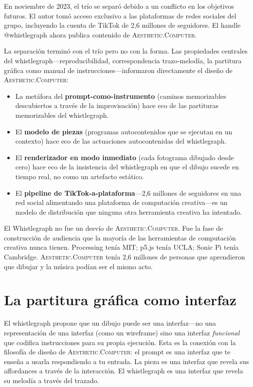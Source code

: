 \documentclass[10pt,letterpaper,twocolumn]{article}
\newcommand{\ac}{\textsc{Aesthetic.Computer}}
\begin{document}
En noviembre de 2023, el trío se separó debido a un conflicto en los objetivos futuros. El autor tomó acceso exclusivo a las plataformas de redes sociales del grupo, incluyendo la cuenta de TikTok de 2,6 millones de seguidores. El handle @whistlegraph ahora publica contenido de \ac{}.

La separación terminó con el trío pero no con la forma. Las propiedades centrales del whistlegraph---reproducibilidad, correspondencia trazo-melodía, la partitura gráfica como manual de instrucciones---informaron directamente el diseño de \ac{}:

\begin{itemize}
  \item La metáfora del \textbf{prompt-como-instrumento} (caminos memorizables descubiertos a través de la improvisación) hace eco de las partituras memorizables del whistlegraph.
  \item El \textbf{modelo de piezas} (programas autocontenidos que se ejecutan en un contexto) hace eco de las actuaciones autocontenidas del whistlegraph.
  \item El \textbf{renderizador en modo inmediato} (cada fotograma dibujado desde cero) hace eco de la insistencia del whistlegraph en que el dibujo sucede en tiempo real, no como un artefacto estático.
  \item El \textbf{pipeline de TikTok-a-plataforma}---2,6 millones de seguidores en una red social alimentando una plataforma de computación creativa---es un modelo de distribución que ninguna otra herramienta creativa ha intentado.
\end{itemize}

El Whistlegraph no fue un desvío de \ac{}. Fue la fase de construcción de audiencia que la mayoría de las herramientas de computación creativa nunca tienen. Processing tenía MIT; p5.js tenía UCLA; Sonic Pi tenía Cambridge. \ac{} tenía 2,6 millones de personas que aprendieron que dibujar y la música podían ser el mismo acto.

\section{La partitura gráfica como interfaz}

El whistlegraph propone que un dibujo puede ser una interfaz---no una representación de una interfaz (como un wireframe) sino una interfaz \emph{funcional} que codifica instrucciones para su propia ejecución. Esta es la conexión con la filosofía de diseño de \ac{}: el prompt es una interfaz que te enseña a usarla respondiendo a tu entrada. La pieza es una interfaz que revela sus affordances a través de la interacción. El whistlegraph es una interfaz que revela su melodía a través del trazado.
\end{document}

